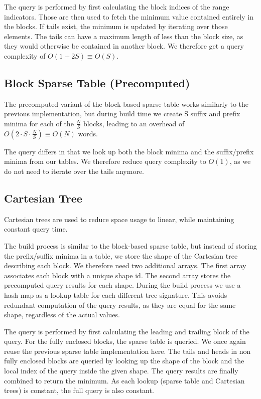\documentclass[a4paper,UKenglish,cleveref,thm-restate]{lipics-v2021}
\begin{document}
The query is performed by first calculating the block indices of the range indicators.
Those are then used to fetch the minimum value contained entirely in the blocks. 
If tails exist, the minimum is updated by iterating over those elements. 
The tails can have a maximum length of less than the block size, as they would otherwise
be contained in another block. We therefore get a query complexity of $O(1 + 2S) \equiv O(S)$.

\subsection{Block Sparse Table (Precomputed)}

The precomputed variant of the block-based sparse table works similarly to the previous implementation,
but during build time we create S suffix and prefix minima for each of the $\frac{N}{S}$ blocks, leading 
to an overhead of $O(2\cdot S\cdot\frac{N}{S})\equiv O(N)$ words.

The query differs in that we look up both the block minima and the suffix/prefix minima
from our tables. We therefore reduce query complexity to $O(1)$, as we do not need to iterate over the tails anymore.

\subsection{Cartesian Tree}

Cartesian trees are used to reduce space usage to linear, while maintaining constant query time.

The build process is similar to the block-based sparse table, but instead of storing the prefix/suffix
minima in a table, we store the shape of the Cartesian tree describing each block. 
We therefore need two additional arrays. The first array associates each block with a unique shape id. 
The second array stores the precomputed query results for each shape. During the build process
we use a hash map as a lookup table for each different tree signature. This avoids redundant computation 
of the query results, as they are equal for the same shape, regardless of the actual values. 

The query is performed by first calculating the leading and trailing block of the 
query. For the fully enclosed blocks, the sparse table is queried. We once again reuse the 
previous sparse table implementation here. The tails and heads in non fully enclosed 
blocks are queried by looking up the shape of the block and the local index of the query inside the 
given shape. The query results are finally combined to return the minimum. As each lookup (sparse table
and Cartesian trees) is constant, the full query is also constant.
\end{document}
